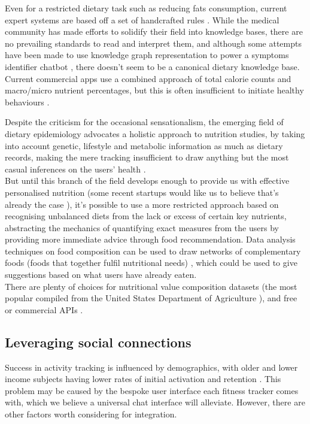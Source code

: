 Even for a restricted dietary task such as reducing fats consumption, current expert systems are based off a set of handcrafted rules \cite{Prochaska2005}. While the medical community has made efforts to solidify their field into knowledge bases, there are no prevailing standards to read and interpret them, and although some attempts have been made to use knowledge graph representation to power a symptoms identifier chatbot \cite{minutoloa2017conversational}, there doesn't seem to be a canonical dietary knowledge base. Current commercial apps use a combined approach of total calorie counts and macro/micro nutrient percentages, but this is often insufficient to initiate healthy behaviours \cite{Davis2016}.

Despite the criticism for the occasional sensationalism, the emerging field of dietary epidemiology advocates a holistic approach to nutrition studies, by taking into account genetic, lifestyle and metabolic information as much as dietary records, making the mere tracking insufficient to draw anything but the most casual inferences on the users' health \cite{byers2001food}. \\
But until this branch of the field develops enough to provide us with effective personalised nutrition (some recent startups would like us to believe that's already the case \cite{habitwebsite}), it's possible to use a more restricted approach based on recognising unbalanced diets from the lack or excess of certain key nutrients, abstracting the mechanics of quantifying exact measures from the users by providing more immediate advice through food recommendation. Data analysis techniques on food composition can be used to draw networks of complementary foods (foods that together fulfil nutritional needs) \cite{Kim2015a}, which could be used to give suggestions based on what users have already eaten. \\
There are plenty of choices for nutritional value composition datasets (the most popular compiled from the United States Department of Agriculture \cite{usda}), and free or commercial APIs \cite{foodapis}.
\subsection{Leveraging social connections}
Success in activity tracking is influenced by demographics, with older and lower income subjects having lower rates of initial activation and retention \cite{Patel2017}. This problem may be caused by the bespoke user interface each fitness tracker comes with, which we believe a universal chat interface will alleviate. However, there are other factors worth considering for integration. 

